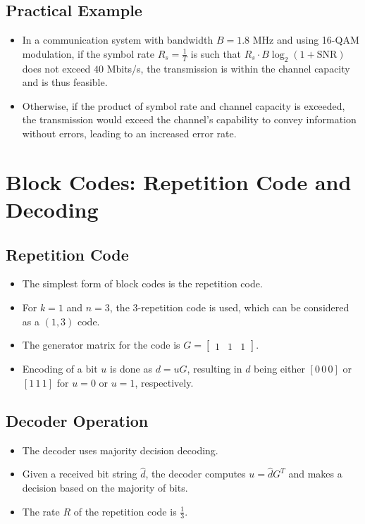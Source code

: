 \subsection*{Practical Example}
\begin{itemize}
    \item In a communication system with bandwidth \( B = 1.8 \) MHz and using 16-QAM modulation, if the symbol rate \( R_s = \frac{1}{T} \) is such that \( R_s \cdot B \log_2(1 + \text{SNR}) \) does not exceed \( 40 \) Mbits/s, the transmission is within the channel capacity and is thus feasible.
    \item Otherwise, if the product of symbol rate and channel capacity is exceeded, the transmission would exceed the channel's capability to convey information without errors, leading to an increased error rate.
\end{itemize}






\section*{Block Codes: Repetition Code and Decoding}

\subsection*{Repetition Code}
\begin{itemize}
    \item The simplest form of block codes is the repetition code.
    \item For \( k = 1 \) and \( n = 3 \), the \( 3 \)-repetition code is used, which can be considered as a \( (1,3) \) code.
    \item The generator matrix for the code is \( G = \begin{bmatrix} 1 & 1 & 1 \end{bmatrix} \).
    \item Encoding of a bit \( u \) is done as \( d = uG \), resulting in \( d \) being either \( [0 \, 0 \, 0] \) or \( [1 \, 1 \, 1] \) for \( u = 0 \) or \( u = 1 \), respectively.
\end{itemize}

\subsection*{Decoder Operation}
\begin{itemize}
    \item The decoder uses majority decision decoding.
    \item Given a received bit string \( \hat{d} \), the decoder computes \( u = \hat{d} G^T \) and makes a decision based on the majority of bits.
    \item The rate \( R \) of the repetition code is \( \frac{1}{3} \).
\end{itemize}

